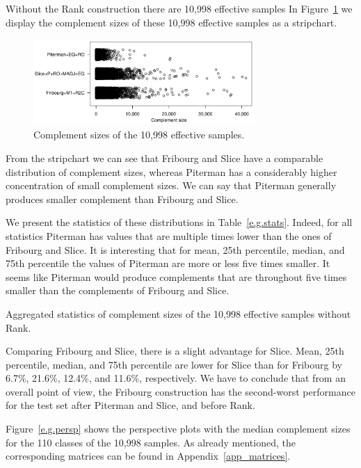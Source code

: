 Without the Rank construction there are 10,998 effective samples In Figure~\ref{e.g.stripchart} we display the complement sizes of these 10,998 effective samples as a stripchart.

\begin{figure}[ht]
\centering
\includegraphics[width=0.75\textwidth]{figures/r/external/goal/s.stripchart.pdf}
\caption{Complement sizes of the 10,998 effective samples.}
\label{e.g.stripchart}
\end{figure}

From the stripchart we can see that Fribourg and Slice have a comparable distribution of complement sizes, whereas Piterman has a considerably higher concentration of small complement sizes. We can say that Piterman generally produces smaller complement than Fribourg and Slice.

We present the statistics of these distributions in Table~\ref{e.g.stats}. 
Indeed, for all statistics Piterman has values that are multiple times lower than the ones of Fribourg and Slice. It is interesting that for mean, 25th percentile, median, and 75th percentile the values of Piterman are more or less five times smaller. It seems like Piterman would produce complements that are throughout five times smaller than the complements of Fribourg and Slice.

\begin{table}[ht]
\centering

\caption{Aggregated statistics of complement sizes of the 10,998 effective samples without Rank.}
\label{e.g.stats}
\end{table}

Comparing Fribourg and Slice, there is a slight advantage for Slice. Mean, 25th percentile, median, and 75th percentile are lower for Slice than for Fribourg by 6.7\%, 21.6\%, 12.4\%, and 11.6\%, respectively. We have to conclude that from an overall point of view, the Fribourg construction has the second-worst performance for the \goal{} test set after Piterman and Slice, and before Rank.

Figure~\ref{e.g.persp} shows the perspective plots with the median complement sizes for the 110 classes of the 10,998 samples. As already mentioned, the corresponding matrices can be found in Appendix~\ref{app_matrices}.


